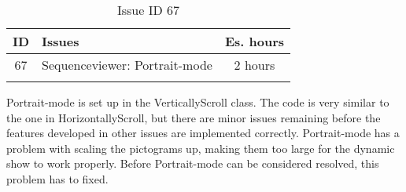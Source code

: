 \begin{longtable} { | c | p{12cm} | c | } 
\hline
	ID 	&	Issues	&		 Es. hours \\\hline
	 67	&	Sequenceviewer: Portrait-mode	&	2 hours \\\hline
\caption{Issue ID 67}
\label{tab:spr4_SVportrait}
\end{longtable}

Portrait-mode is set up in the VerticallyScroll class. The code is very similar to the one in HorizontallyScroll, but there are minor issues remaining before the features developed in other issues are implemented correctly. Portrait-mode has a problem with scaling the pictograms up, making them too large for the dynamic show to work properly. Before Portrait-mode can be considered resolved, this problem has to fixed.